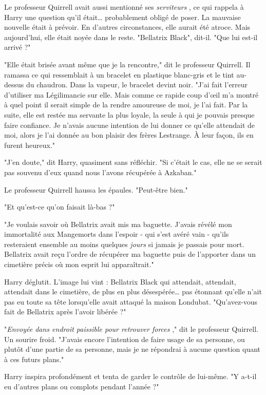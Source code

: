 Le professeur Quirrell avait aussi mentionné ses \emph{serviteurs} , ce qui rappela à Harry une question qu'il était… probablement obligé de poser. La mauvaise nouvelle était à prévoir. En d'autres circonstances, elle aurait été atroce. Mais aujourd'hui, elle était noyée dans le reste. "Bellatrix Black", dit-il. "Que lui est-il arrivé ?"

"Elle était brisée avant même que je la rencontre," dit le professeur Quirrell. Il ramassa ce qui ressemblait à un bracelet en plastique blanc-gris et le tint au-dessus du chaudron. Dans la vapeur, le bracelet devint noir. "J'ai fait l'erreur d'utiliser ma Légilimancie sur elle. Mais comme ce rapide coup d'œil m'a montré à quel point il serait simple de la rendre amoureuse de moi, je l'ai fait. Par la suite, elle est restée ma servante la plus loyale, la seule à qui je pouvais presque faire confiance. Je n'avais aucune intention de lui donner ce qu'elle attendait de moi, alors je l'ai donnée au bon plaisir des frères Lestrange. À leur façon, ils en furent heureux."

"J'en doute," dit Harry, quasiment sans réfléchir. "Si c'était le cas, elle ne se serait pas souvenu d'eux quand nous l'avons récupérée à Azkaban."

Le professeur Quirrell haussa les épaules. "Peut-être bien."

"Et qu'est-ce qu'on faisait là-bas ?"

"Je voulais savoir où Bellatrix avait mis ma baguette. J'avais révélé mon immortalité aux Mangemorts dans l'espoir - qui s'est avéré vain - qu'ils resteraient ensemble au moins quelques \emph{jours}  si jamais je passais pour mort. Bellatrix avait reçu l'ordre de récupérer ma baguette puis de l'apporter dans un cimetière précis où mon esprit lui apparaîtrait."

Harry déglutit. L'image lui vint : Bellatrix Black qui attendait, attendait, attendait dans le cimetière, de plus en plus désespérée… pas étonnant qu'elle n'ait pas eu toute sa tête lorsqu'elle avait attaqué la maison Londubat. "Qu'avez-vous fait de Bellatrix après l'avoir libérée ?"

"\emph{Envoyée dans endroit paissible pour retrouver forces} ," dit le professeur Quirrell. Un sourire froid. "J'avais encore l'intention de faire usage de sa personne, ou plutôt d'une partie de sa personne, mais je ne répondrai à aucune question quant à ces futurs plans."

Harry inspira profondément et tenta de garder le contrôle de lui-même. "Y a-t-il eu d'autres plans ou complots pendant l'année ?"

